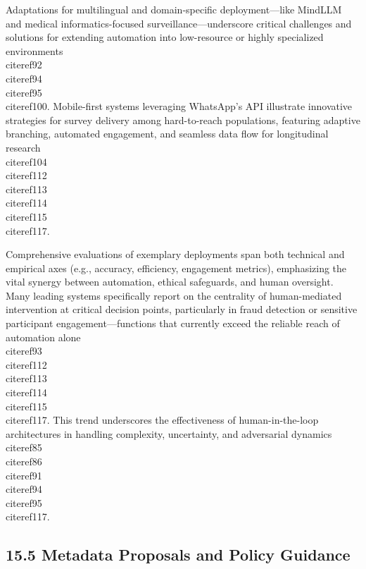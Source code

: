 \documentclass[11pt]{article}
\begin{document}
Adaptations for multilingual and domain-specific deployment—like MindLLM and medical informatics-focused surveillance—underscore critical challenges and solutions for extending automation into low-resource or highly specialized environments~\\cite{ref92}\\cite{ref94}\\cite{ref95}\\cite{ref100}. Mobile-first systems leveraging WhatsApp’s API illustrate innovative strategies for survey delivery among hard-to-reach populations, featuring adaptive branching, automated engagement, and seamless data flow for longitudinal research~\\cite{ref104}\\cite{ref112}\\cite{ref113}\\cite{ref114}\\cite{ref115}\\cite{ref117}.

Comprehensive evaluations of exemplary deployments span both technical and empirical axes (e.g., accuracy, efficiency, engagement metrics), emphasizing the vital synergy between automation, ethical safeguards, and human oversight. Many leading systems specifically report on the centrality of human-mediated intervention at critical decision points, particularly in fraud detection or sensitive participant engagement—functions that currently exceed the reliable reach of automation alone~\\cite{ref93}\\cite{ref112}\\cite{ref113}\\cite{ref114}\\cite{ref115}\\cite{ref117}. This trend underscores the effectiveness of human-in-the-loop architectures in handling complexity, uncertainty, and adversarial dynamics~\\cite{ref85}\\cite{ref86}\\cite{ref91}\\cite{ref94}\\cite{ref95}\\cite{ref117}.

\subsection{15.5 Metadata Proposals and Policy Guidance}
\end{document}
